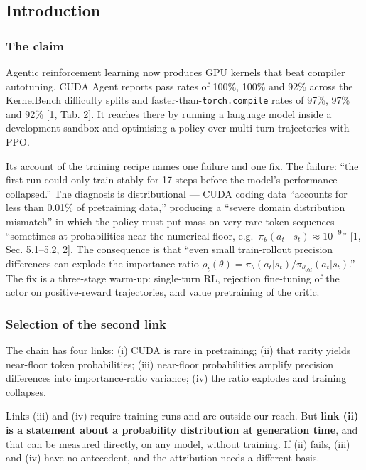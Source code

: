 \documentclass[
  11pt,
]{article}
\begin{document}
\hypertarget{introduction}{%
\subsection{Introduction}\label{introduction}}

\hypertarget{the-claim}{%
\subsubsection{The claim}\label{the-claim}}

Agentic reinforcement learning now produces GPU kernels that beat
compiler autotuning. CUDA Agent reports pass rates of 100\%, 100\% and
92\% across the KernelBench difficulty splits and
faster-than-\texttt{torch.compile} rates of 97\%, 97\% and 92\% {[}1,
Tab. 2{]}. It reaches there by running a language model inside a
development sandbox and optimising a policy over multi-turn trajectories
with PPO.

Its account of the training recipe names one failure and one fix. The
failure: ``the first run could only train stably for 17 steps before the
model's performance collapsed.'' The diagnosis is distributional ---
CUDA coding data ``accounts for less than 0.01\% of pretraining data,''
producing a ``severe domain distribution mismatch'' in which the policy
must put mass on very rare token sequences ``sometimes at probabilities
near the numerical floor,
e.g.~\(\pi_\theta(a_t \mid s_t) \approx 10^{-9}\)'' {[}1, Sec. 5.1--5.2,
2{]}. The consequence is that ``even small train-rollout precision
differences can explode the importance ratio
\(\rho_t(\theta) = \pi_\theta(a_t|s_t)/\pi_{\theta_{old}}(a_t|s_t)\).''
The fix is a three-stage warm-up: single-turn RL, rejection fine-tuning
of the actor on positive-reward trajectories, and value pretraining of
the critic.

\hypertarget{selection-of-the-second-link}{%
\subsubsection{Selection of the second
link}\label{selection-of-the-second-link}}

The chain has four links: (i) CUDA is rare in pretraining; (ii) that
rarity yields near-floor token probabilities; (iii) near-floor
probabilities amplify precision differences into importance-ratio
variance; (iv) the ratio explodes and training collapses.

Links (iii) and (iv) require training runs and are outside our reach.
But \textbf{link (ii) is a statement about a probability distribution at
generation time}, and that can be measured directly, on any model,
without training. If (ii) fails, (iii) and (iv) have no antecedent, and
the attribution needs a different basis.
\end{document}

